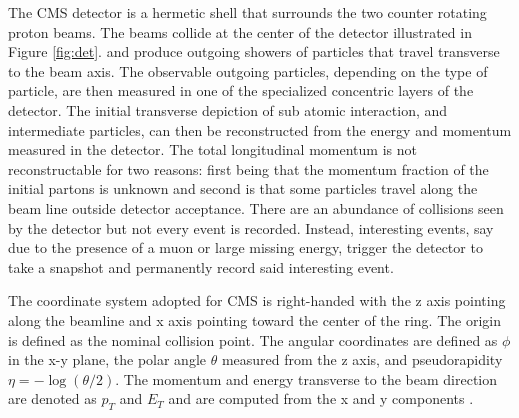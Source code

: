 The CMS detector is a hermetic shell that surrounds the two counter rotating proton beams. The beams collide at the center of the detector illustrated in Figure \ref{fig:det}. and produce outgoing showers of particles that travel transverse to the beam axis. The observable outgoing particles, depending on the type of particle, are then measured in one of the specialized concentric layers of the detector. The initial transverse depiction of sub atomic interaction, and intermediate particles, can then be reconstructed from the energy and momentum measured in the detector. The total longitudinal momentum is not reconstructable for two reasons: first being that the momentum fraction of the initial partons is unknown and second is that some particles travel along the beam line outside detector acceptance.  There are an abundance of collisions seen by the detector but not every event is recorded. Instead, interesting events, say due to the presence of a muon or large missing energy, trigger the detector to take a snapshot and permanently record said interesting event.

The coordinate system adopted for CMS is right-handed with the z axis pointing along the beamline and x axis pointing toward the center of the ring. The origin is defined as the nominal collision point. The angular coordinates are defined as $\phi$ in the x-y plane, the polar angle $\theta$ measured from the z axis, and pseudorapidity $\eta =-\log(\theta/2)$. The momentum and energy transverse to the beam direction are denoted as $p_T$ and $E_T$ and are computed from the x and y components \cite{CMS:2017lum}. 

